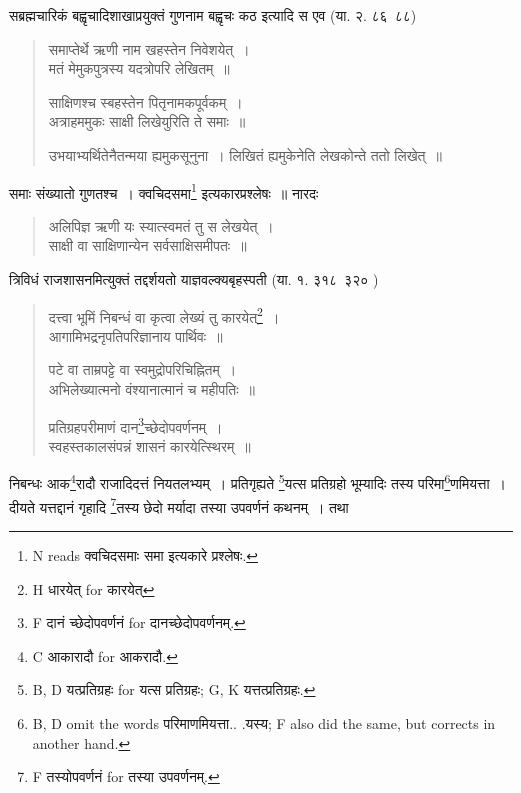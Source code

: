 \documentclass[11pt, openany]{book}
\begin{document}
सब्रह्मचारिकं बह्वृचादिशाखाप्रयुक्तं गुणनाम बह्वृचः कठ इत्यादि स एव (या. २. ८६\textendash\ ८८) 

\begin{quote}
{\vy समाप्तेर्थे ऋणी नाम खहस्तेन निवेशयेत्~।\\
मतं मेमुकपुत्रस्य यदत्रोपरि लेखितम्~॥

साक्षिणश्च स्बहस्तेन पितृनामकपूर्वकम्~।\\
अत्राहममुकः साक्षी लिखेयुरिति ते समाः~॥

उभयाभ्यर्थितेनैतन्मया ह्यमुकसूनुना~।
लिखितं ह्यमुकेनेति लेखकोन्ते ततो लिखेत्~॥}
\end{quote}

समाः संख्यातो गुणतश्च~। क्वचिदसमा\renewcommand{\thefootnote}{1}\footnote{N reads क्वचिदसमाः समा इत्यकारे प्रश्लेषः.} इत्यकारप्रश्लेषः~॥ नारदः

\begin{quote}
{\vy अलिपिज्ञ ऋणी यः स्यात्स्वमतं तु स लेखयेत्~।\\
साक्षी वा साक्षिणान्येन सर्वसाक्षिसमीपतः~॥}
\end{quote}

त्रिविधं राजशासनमित्युक्तं तद्दर्शयतो याज्ञवल्क्यबृहस्पती (या. १. ३१८\textendash\ ३२० )

\begin{quote}
{\vy दत्त्वा भूमिं निबन्धं वा कृत्वा लेख्यं तु कारयेत्\renewcommand{\thefootnote}{2}\footnote{H धारयेत् for कारयेत्}~।\\
आगामिभद्रनृपतिपरिज्ञानाय पार्थिवः~॥

पटे वा ताम्रपट्टे वा स्वमुद्रोपरिचिह्नितम्~।\\
अभिलेख्यात्मनो वंश्यानात्मानं च महीपतिः~॥

प्रतिग्रहपरीमाणं दान\renewcommand{\thefootnote}{3}\footnote{F दानं च्छेदोपवर्णनं for दानच्छेदोपवर्णनम्.}च्छेदोपवर्णनम्~।\\
स्वहस्तकालसंपन्नं शासनं कारयेत्स्थिरम्~॥}
\end{quote}

\newpage
{}

\noindent
निबन्धः आक\renewcommand{\thefootnote}{1}\footnote{C आकारादौ for आकरादौ.}रादौ राजादिदत्तं नियतलभ्यम्~। प्रतिगृह्यते \renewcommand{\thefootnote}{2}\footnote{B, D यत्प्रतिग्रहः for यत्स प्रतिग्रहः; G, K यत्तत्प्रतिग्रहः.}यत्स प्रतिग्रहो भूम्यादिः तस्य परिमा\renewcommand{\thefootnote}{3}\footnote{B, D omit the words परिमाणमियत्ता.. .यस्य; F also did the same, but corrects in another hand.}णमियत्ता~। दीयते यत्तद्दानं गृहादि \renewcommand{\thefootnote}{4}\footnote{F तस्योपवर्णनं for तस्या उपवर्णनम्.}तस्य छेदो मर्यादा तस्या उपवर्णनं कथनम्~। तथा
\end{document}
